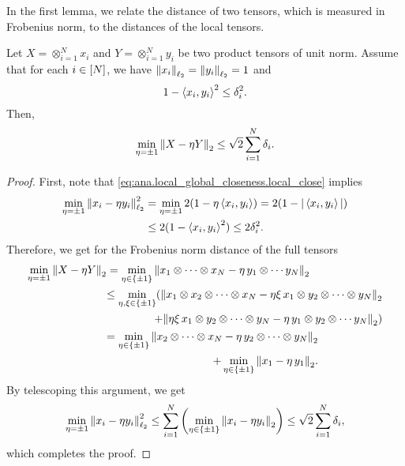 In the first lemma, we relate the  distance of two tensors, which is measured in Frobenius norm, to the distances of the local tensors.
\begin{lemma}%
  \label{lem:ana.local_global_closeness}
  Let $X = \otimes_{i=1}^N x_i$ and $Y = \otimes_{i=1}^N y_i$ be two product tensors of unit norm.
  Assume that for each $i \in [N]$, we have ${\Vert x_i\Vert}_{\ell_2} = {\Vert y_i\Vert}_{\ell_2} = 1$ and
  \[
    \label{eq:ana.local_global_closeness.local_close}
    1 - \Braket{x_i, y_i}^2 \le \delta_i^2.
  \]
  Then,
  \[
    \min_{\eta = \pm 1} {\left\Vert X - \eta Y\right\Vert}_{2} \le \sqrt{2} \sum_{i=1}^N \delta_i.
  \]
\end{lemma}
\begin{proof}
  First, note that \cref{eq:ana.local_global_closeness.local_close} implies
  \begin{align}
    \min_{\eta = \pm 1} {\Vert x_i - \eta y_i\Vert}_{\ell_2}^2
    &= \min_{\eta = \pm 1} 2 (1 - \eta \braket{x_i, y_i})
    = 2 (1 - {\vert\braket{x_i, y_i}\vert}) \\
    &\le 2 (1 - \braket{x_i, y_i}^2)
    \le 2 \delta_i^2.
  \end{align}
  Therefore, we get for the Frobenius norm distance of the full tensors
  \begin{align}
    \min_{\eta=\pm1} {\left\Vert X - \eta Y\right\Vert}_{2}
    &= \min_{\eta \in \{\pm1\}} {\left\Vert x_1 \otimes \cdots \otimes x_N - \eta\, y_1 \otimes \cdots y_N\right\Vert}_{2} \\
    &\begin{aligned}
      \le \min_{\eta,\xi \in \{\pm1\}} \Large(
        {\left\Vert x_1 \otimes x_2 \otimes \cdots \otimes x_N - \eta \xi \, x_1 \otimes y_2 \otimes \cdots \otimes y_N\right\Vert}_{2} \\
        + {\left\Vert\eta \xi \, x_1 \otimes y_2 \otimes \cdots \otimes y_N - \eta\, y_1 \otimes y_2 \otimes \cdots y_N\right\Vert}_{2}
      \Large)
    \end{aligned}\\
    &\begin{aligned}
      = \min_{\eta\in\{\pm1\}} {\left\Vert x_2 \otimes \cdots \otimes x_N - \eta \, y_2 \otimes \cdots \otimes y_N\right\Vert}_{2} \\
        + \min_{\eta\in\{\pm1\}} {\left\Vert x_1 - \eta\, y_1\right\Vert}_{2}.
    \end{aligned}
  \end{align}
  By telescoping this argument, we get
  \[
    \min_{\eta = \pm 1} {\Vert x_i - \eta y_i\Vert}_{\ell_2}^2
    \le \sum_{i=1}^N \left( \min_{\eta\in\{\pm1\}} {\left\Vert x_i - \eta y_i\right\Vert}_{2} \right)
    \le \sqrt{2} \sum_{i=1}^N \delta_i,
  \]
  which completes the proof.
\end{proof}

